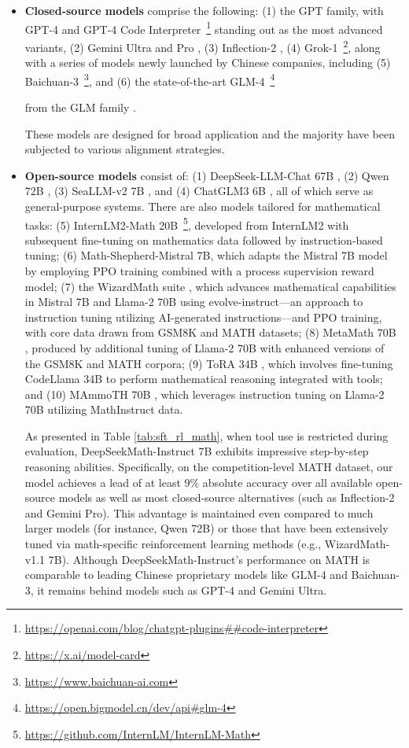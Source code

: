 \begin{itemize}[topsep=0pt]
\begin{itemize}[topsep=0pt]
    \item \textbf{Closed-source models} comprise the following: (1) the GPT family, with GPT-4 \citep{gpt4} and GPT-4 Code Interpreter~\footnote{\url{https://openai.com/blog/chatgpt-plugins\#\#code-interpreter}} standing out as the most advanced variants, (2) Gemini Ultra and Pro \citep{gemini}, (3) Inflection-2 \citep{inflection-2}, (4) Grok-1~\footnote{\url{https://x.ai/model-card}}, along with a series of models newly launched by Chinese companies, including (5) Baichuan-3~\footnote{\url{https://www.baichuan-ai.com}}, and (6) the state-of-the-art GLM-4~\footnote{\url{https://open.bigmodel.cn/dev/api\#glm-4}}

    from the GLM family \citep{glm}.

These models are designed for broad application and the majority have been subjected to various alignment strategies.

\item \textbf{Open-source models} consist of: (1) DeepSeek-LLM-Chat 67B \citep{deepseek-llm}, (2) Qwen 72B \citep{qwen}, (3) SeaLLM-v2 7B \citep{seallm}, and (4) ChatGLM3 6B \citep{chatglm3}, all of which serve as general-purpose systems. There are also models tailored for mathematical tasks: (5) InternLM2-Math 20B~\footnote{\url{https://github.com/InternLM/InternLM-Math}}, developed from InternLM2 with subsequent fine-tuning on mathematics data followed by instruction-based tuning; (6) Math-Shepherd-Mistral 7B, which adapts the Mistral 7B \citep{mistral} model by employing PPO training \citep{schulman2017proximal} combined with a process supervision reward model; (7) the WizardMath suite \citep{wizardmath}, which advances mathematical capabilities in Mistral 7B and Llama-2 70B \citep{llama2} using evolve-instruct—an approach to instruction tuning utilizing AI-generated instructions—and PPO training, with core data drawn from GSM8K and MATH datasets; (8) MetaMath 70B \citep{metamath}, produced by additional tuning of Llama-2 70B with enhanced versions of the GSM8K and MATH corpora; (9) ToRA 34B \cite{tora}, which involves fine-tuning CodeLlama 34B to perform mathematical reasoning integrated with tools; and (10) MAmmoTH 70B \citep{MathInstruct}, which leverages instruction tuning on Llama-2 70B utilizing MathInstruct data.

As presented in Table \ref{tab:sft_rl_math}, when tool use is restricted during evaluation, DeepSeekMath-Instruct 7B exhibits impressive step-by-step reasoning abilities. Specifically, on the competition-level MATH dataset, our model achieves a lead of at least 9\% absolute accuracy over all available open-source models as well as most closed-source alternatives (such as Inflection-2 and Gemini Pro). This advantage is maintained even compared to much larger models (for instance, Qwen 72B) or those that have been extensively tuned via math-specific reinforcement learning methods (e.g., WizardMath-v1.1 7B). Although DeepSeekMath-Instruct’s performance on MATH is comparable to leading Chinese proprietary models like GLM-4 and Baichuan-3, it remains behind models such as GPT-4 and Gemini Ultra.


\end{itemize}
\end{itemize}
